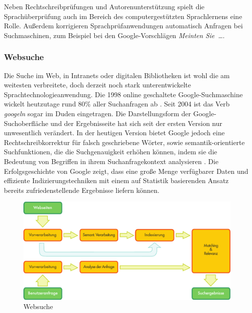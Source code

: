 \documentclass[]{../../metanetpaper}
\begin{document}
\begin{multicols}{2}
Neben Rechtschreibprüfungen und Autorenunterstützung spielt die Sprachüberprüfung auch im Bereich des computergestützten Sprachlernens eine Rolle. Außerdem korrigieren Sprachprüfanwendungen automatisch Anfragen bei Suchmaschinen, zum Beispiel bei den Google-Vorschlägen \textit{Meinten Sie~\dots}.

\subsubsection{Websuche}

Die Suche im Web, in Intranets oder digitalen Bibliotheken ist wohl die am weitesten verbreitete, doch derzeit noch stark unterentwickelte Sprachtechnologieanwendung. Die 1998 online geschaltete Google-Suchmaschine wickelt heutzutage rund 80\% aller Suchanfragen ab \cite{spi1}. Seit 2004 ist das Verb \textit{googeln} sogar im Duden eingetragen. Die Darstellungsform der Google-Suchoberfläche und der Ergebnisseite hat sich seit der ersten Version nur unwesentlich verändert. In der heutigen Version bietet Google jedoch eine Rechtschreibkorrektur für falsch geschriebene Wörter, sowie semantik-orientierte Suchfunktionen, die die Suchgenauigkeit erhöhen können, indem sie die Bedeutung von Begriffen in ihrem Suchanfragekontext analysieren \cite{pc1}. Die Erfolgsgeschichte von Google zeigt, dass eine große Menge verfügbarer Daten und effiziente Indizierungstechniken mit einem auf Statistik basierenden Ansatz bereits zufriedenstellende Ergebnisse liefern können. 

\begin{figure}[htb]
  \vspace{-9mm}
  \center
  \includegraphics[width=\textwidth]{../_media/german/web_search_architecture}
  \vspace{-5mm}
  \caption{Websuche}
  \label{fig:websearcharch_de}
\end{figure}


\end{multicols}
\end{document}
